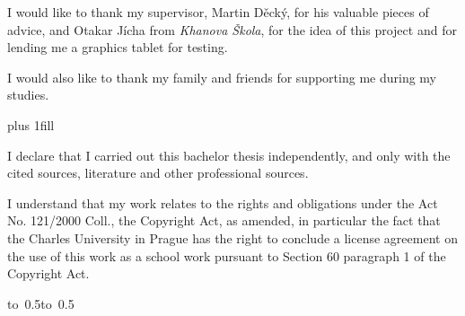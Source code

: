 \documentclass[12pt,a4paper]{report}
\let\openright=\clearpage
\begin{document}
\newpage



\openright

\noindent
I would like to thank my supervisor, Martin Děcký, for his valuable pieces of advice, and Otakar Jícha from \textit{Khanova Škola}, for the idea of this project and for lending me a graphics tablet for testing.

I would also like to thank my family and friends for supporting me during my studies.



\newpage


\vglue 0pt plus 1fill

\noindent
I declare that I carried out this bachelor thesis independently, and only with the cited
sources, literature and other professional sources.

\medskip\noindent
I understand that my work relates to the rights and obligations under the Act No.
121/2000 Coll., the Copyright Act, as amended, in particular the fact that the Charles
University in Prague has the right to conclude a license agreement on the use of this
work as a school work pursuant to Section 60 paragraph 1 of the Copyright Act.

\vspace{10mm}

\hbox{\hbox to 0.5\hbox to 0.5}

\vspace{20mm}
\newpage

\end{document}
